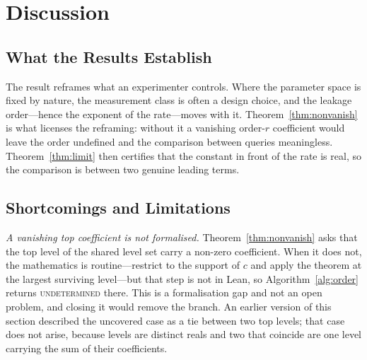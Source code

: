 \section{Discussion}
\label{sec:discussion}

\subsection{What the Results Establish}

The result reframes what an experimenter controls. Where the parameter space is fixed by
nature, the measurement class is often a design choice, and the leakage order---hence the
exponent of the rate---moves with it. Theorem~\ref{thm:nonvanish} is what licenses the
reframing: without it a vanishing order-$r$ coefficient would leave the order undefined and
the comparison between queries meaningless. Theorem~\ref{thm:limit} then certifies that the
constant in front of the rate is real, so the comparison is between two genuine leading
terms.

\subsection{Shortcomings and Limitations}
\label{sec:limits}

\emph{A vanishing top coefficient is not formalised.} Theorem~\ref{thm:nonvanish} asks that
the top level of the shared level set carry a non-zero coefficient. When it does not, the
mathematics is routine---restrict to the support of $c$ and apply the theorem at the largest
surviving level---but that step is not in Lean, so Algorithm~\ref{alg:order} returns
\textsc{undetermined} there. This is a formalisation gap and not an open problem, and closing
it would remove the branch. An earlier version of this section described the uncovered case as
a tie between two top levels; that case does not arise, because levels are distinct reals and
two that coincide are one level carrying the sum of their coefficients.


